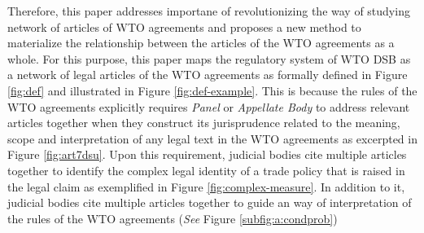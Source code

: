 


Therefore, this paper addresses importane of revolutionizing the way of studying network of articles of WTO agreements and proposes a new method to
materialize the relationship between the articles of the WTO agreements as a whole. 
For this purpose, this paper maps
the regulatory system of WTO DSB
as a network of legal articles
of the WTO agreements as formally defined in Figure \ref{fig:def} and illustrated in Figure \ref{fig:def-example}. This is because the rules of the WTO agreements
explicitly requires \textit{Panel} or \textit{Appellate Body} to address
relevant articles together when they construct its jurisprudence related to the meaning, scope and interpretation of any legal text in the WTO agreements as excerpted in Figure \ref{fig:art7dsu}.
Upon this requirement, judicial bodies cite
multiple articles together
to identify the complex legal identity of a trade policy that is raised in the legal claim as exemplified in Figure \ref{fig:complex-measure}.
In addition to it, judicial bodies cite multiple articles together
to guide an way of interpretation of the rules of the WTO agreements (\textit{See} Figure \ref{subfig:a:condprob})




